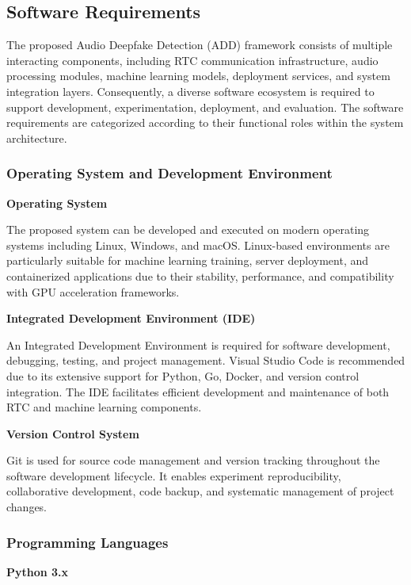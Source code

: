 
\subsection{Software Requirements}

The proposed Audio Deepfake Detection (ADD) framework consists of multiple interacting components, including RTC communication infrastructure, audio processing modules, machine learning models, deployment services, and system integration layers. Consequently, a diverse software ecosystem is required to support development, experimentation, deployment, and evaluation. The software requirements are categorized according to their functional roles within the system architecture.

\subsubsection{Operating System and Development Environment}
\vspace{0.5cm}
\textbf{Operating System}

The proposed system can be developed and executed on modern operating systems including Linux, Windows, and macOS. Linux-based environments are particularly suitable for machine learning training, server deployment, and containerized applications due to their stability, performance, and compatibility with GPU acceleration frameworks.

\textbf{Integrated Development Environment (IDE)}

An Integrated Development Environment is required for software development, debugging, testing, and project management. Visual Studio Code is recommended due to its extensive support for Python, Go, Docker, and version control integration. The IDE facilitates efficient development and maintenance of both RTC and machine learning components.

\textbf{Version Control System}

Git is used for source code management and version tracking throughout the software development lifecycle. It enables experiment reproducibility, collaborative development, code backup, and systematic management of project changes.


\subsubsection{Programming Languages}
\vspace{0.5cm}
\textbf{Python 3.x}

